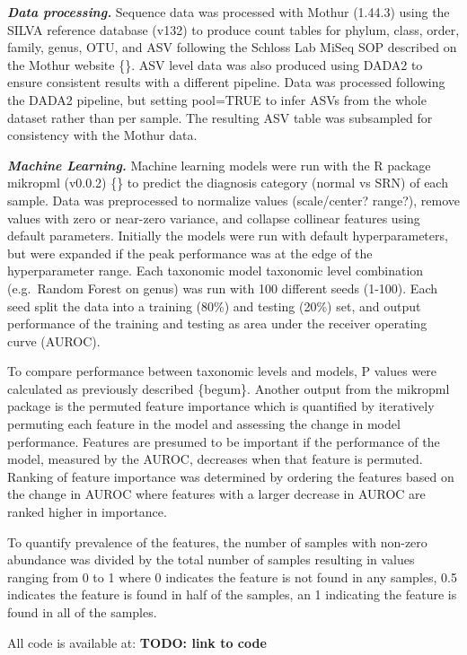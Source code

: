 \documentclass[
]{article}
\begin{document}
\textbf{\emph{Data processing.}} Sequence data was processed with Mothur
(1.44.3) using the SILVA reference database (v132) to produce count
tables for phylum, class, order, family, genus, OTU, and ASV following
the Schloss Lab MiSeq SOP described on the Mothur website \{\}. ASV
level data was also produced using DADA2 to ensure consistent results
with a different pipeline. Data was processed following the DADA2
pipeline, but setting pool=TRUE to infer ASVs from the whole dataset
rather than per sample. The resulting ASV table was subsampled for
consistency with the Mothur data.

\textbf{\emph{Machine Learning.}} Machine learning models were run with
the R package mikropml (v0.0.2) \{\} to predict the diagnosis category
(normal vs SRN) of each sample. Data was preprocessed to normalize
values (scale/center? range?), remove values with zero or near-zero
variance, and collapse collinear features using default parameters.
Initially the models were run with default hyperparameters, but were
expanded if the peak performance was at the edge of the hyperparameter
range. Each taxonomic model taxonomic level combination (e.g.~Random
Forest on genus) was run with 100 different seeds (1-100). Each seed
split the data into a training (80\%) and testing (20\%) set, and output
performance of the training and testing as area under the receiver
operating curve (AUROC).

To compare performance between taxonomic levels and models, P values
were calculated as previously described \{begum\}. Another output from
the mikropml package is the permuted feature importance which is
quantified by iteratively permuting each feature in the model and
assessing the change in model performance. Features are presumed to be
important if the performance of the model, measured by the AUROC,
decreases when that feature is permuted. Ranking of feature importance
was determined by ordering the features based on the change in AUROC
where features with a larger decrease in AUROC are ranked higher in
importance.

To quantify prevalence of the features, the number of samples with
non-zero abundance was divided by the total number of samples resulting
in values ranging from 0 to 1 where 0 indicates the feature is not found
in any samples, 0.5 indicates the feature is found in half of the
samples, an 1 indicating the feature is found in all of the samples.

All code is available at: \textbf{TODO: link to code}
\end{document}
